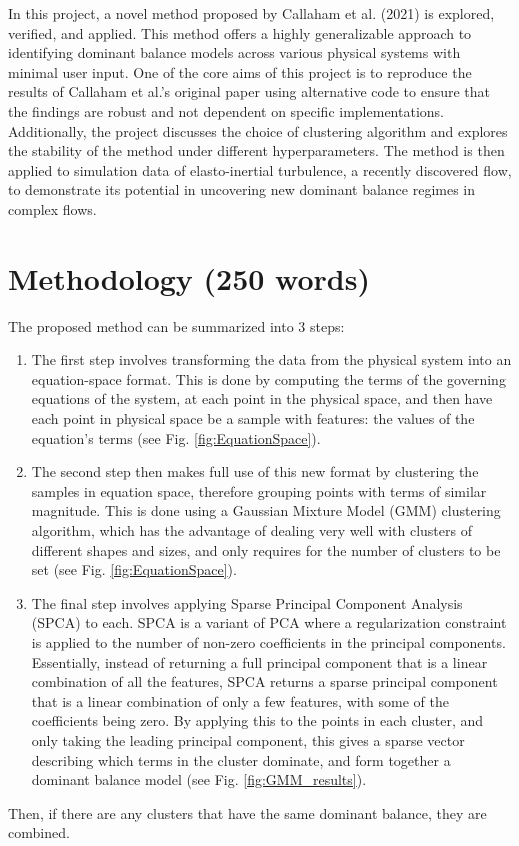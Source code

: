 \documentclass[12pt]{report} %
\begin{document}
\vspace{5mm}

In this project, a novel method proposed by Callaham et al. (2021)\cite{callaham2021learning} is explored, verified, and applied. This method offers a highly generalizable approach to identifying dominant balance models across various physical systems with minimal user input. One of the core aims of this project is to reproduce the results of Callaham et al.’s original paper using alternative code to ensure that the findings are robust and not dependent on specific implementations. Additionally, the project discusses the choice of clustering algorithm and explores the stability of the method under different hyperparameters. The method is then applied to simulation data of elasto-inertial turbulence\cite{Samanta2012eit}, a recently discovered flow, to demonstrate its potential in uncovering new dominant balance regimes in complex flows.


\section{Methodology (250 words)}

The proposed method can be summarized into 3 steps:
\begin{enumerate}
  \item The first step involves transforming the data from the physical system into an equation-space format. This is done by computing the terms of the governing equations of the system, at each point in the physical space, and then have each point in physical space be a sample with features: the values of the equation's terms (see Fig. \ref{fig:EquationSpace}).
  \item The second step then makes full use of this new format by clustering the samples in equation space, therefore grouping points with terms of similar magnitude. This is done using a Gaussian Mixture Model (GMM) clustering algorithm, which has the advantage of dealing very well with clusters of different shapes and sizes, and only requires for the number of clusters to be set (see Fig. \ref{fig:EquationSpace}).
  \item The final step involves applying Sparse Principal Component Analysis (SPCA) to each. SPCA is a variant of PCA where a regularization constraint is applied to the number of non-zero coefficients in the principal components. Essentially, instead of returning a full principal component that is a linear combination of all the features, SPCA returns a sparse principal component that is a linear combination of only a few features, with some of the coefficients being zero. By applying this to the points in each cluster, and only taking the leading principal component, this gives a sparse vector describing which terms in the cluster dominate, and form together a dominant balance model (see Fig. \ref{fig:GMM_results}).
\end{enumerate}
Then, if there are any clusters that have the same dominant balance, they are combined.
\end{document}
